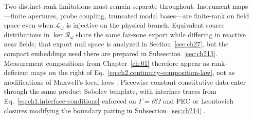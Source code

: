 Two distinct rank limitations must remain separate throughout. Instrument maps---finite apertures, probe coupling, truncated modal bases---are finite-rank on field space even when \(\mathcal{L}_\omega\) is injective on the physical branch. Equivalent source distributions in \(\ker\mathcal{R}_\omega\) share the same far-zone export while differing in reactive near fields; that export null space is analyzed in Section~\ref{sec:ch27}, but the compact embeddings used there are prepared in Subsection~\ref{sec:ch213}. Measurement compositions from Chapter~\ref{ch:01} therefore appear as rank-deficient maps on the right of Eq.~\eqref{eq:ch2.continuity-composition-law}, not as modifications of Maxwell's local laws \cite{stratton1941}. Piecewise-constant constitutive data enter through the same product Sobolev template, with interface traces from Eq.~\eqref{eq:ch1.interface-conditions} enforced on \(\Gamma=\partial\Omega\) and PEC or Leontovich closures modifying the boundary pairing in Subsection~\ref{sec:ch214} \cite{stratton1941}.
